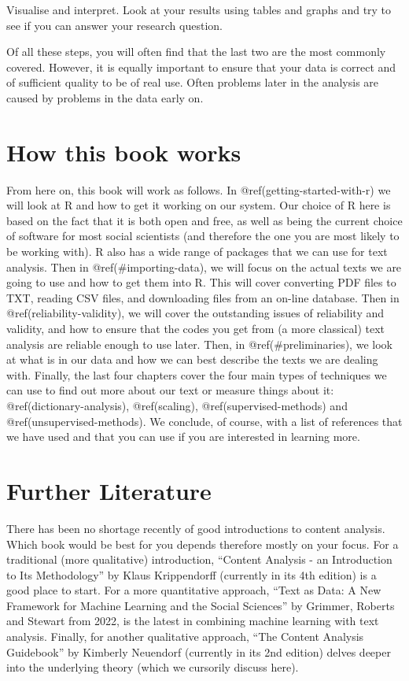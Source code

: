 \documentclass[
]{book}
\begin{document}
Visualise and interpret. Look at your results using tables and graphs and try to see if you can answer your research question.

Of all these steps, you will often find that the last two are the most commonly covered. However, it is equally important to ensure that your data is correct and of sufficient quality to be of real use. Often problems later in the analysis are caused by problems in the data early on.

\section{How this book works}\label{how-this-book-works}

From here on, this book will work as follows. In @ref(getting-started-with-r) we will look at R and how to get it working on our system. Our choice of R here is based on the fact that it is both open and free, as well as being the current choice of software for most social scientists (and therefore the one you are most likely to be working with). R also has a wide range of packages that we can use for text analysis. Then in @ref(\#importing-data), we will focus on the actual texts we are going to use and how to get them into R. This will cover converting PDF files to TXT, reading CSV files, and downloading files from an on-line database. Then in @ref(reliability-validity), we will cover the outstanding issues of reliability and validity, and how to ensure that the codes you get from (a more classical) text analysis are reliable enough to use later. Then, in @ref(\#preliminaries), we look at what is in our data and how we can best describe the texts we are dealing with. Finally, the last four chapters cover the four main types of techniques we can use to find out more about our text or measure things about it: @ref(dictionary-analysis), @ref(scaling), @ref(supervised-methods) and @ref(unsupervised-methods). We conclude, of course, with a list of references that we have used and that you can use if you are interested in learning more.

\section{Further Literature}\label{further-literature}

There has been no shortage recently of good introductions to content analysis. Which book would be best for you depends therefore mostly on your focus. For a traditional (more qualitative) introduction, ``Content Analysis - an Introduction to Its Methodology'' by Klaus Krippendorff (currently in its 4th edition) is a good place to start. For a more quantitative approach, ``Text as Data: A New Framework for Machine Learning and the Social Sciences'' by Grimmer, Roberts and Stewart from 2022, is the latest in combining machine learning with text analysis. Finally, for another qualitative approach, ``The Content Analysis Guidebook'' by Kimberly Neuendorf (currently in its 2nd edition) delves deeper into the underlying theory (which we cursorily discuss here).
\end{document}
